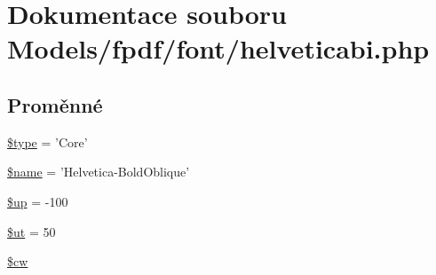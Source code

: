 \hypertarget{helveticabi_8php}{\section{Dokumentace souboru Models/fpdf/font/helveticabi.php}
\label{helveticabi_8php}
}
\subsection*{Proměnné}
\begin{DoxyCompactItemize}
\item 
\hyperlink{helveticabi_8php_a9a4a6fba2208984cabb3afacadf33919}{\$type} = 'Core'
\item 
\hyperlink{helveticabi_8php_ab2fc40d43824ea3e1ce5d86dee0d763b}{\$name} = 'Helvetica-\/Bold\-Oblique'
\item 
\hyperlink{helveticabi_8php_a6b5ad2ac55f9df46e8f34e78fbd6f176}{\$up} = -\/100
\item 
\hyperlink{helveticabi_8php_aadd3f841051043ee58e587e840e8dd0b}{\$ut} = 50
\item 
\hyperlink{helveticabi_8php_ac2951b03dbb0317e6c61ec920b7479dc}{\$cw}
\end{DoxyCompactItemize}


